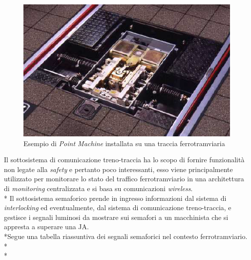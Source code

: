 \begin{itemize}
\begin{figure}[h]
		\centering
		\includegraphics[width=0.7\linewidth]{img/pointmachine}
		\caption{Esempio di \emph{Point Machine} installata su una traccia ferrotramviaria}
		\label{fig:pointmachine}
	\end{figure}
\end{itemize}
Il sottosistema di comunicazione treno-traccia ha lo scopo di fornire funzionalit\`a non legate alla \emph{safety} e pertanto poco interessanti, esso viene principalmente utilizzato per monitorare lo stato del traffico ferrotramviario in una architettura di \emph{monitoring} centralizzata e si basa su comunicazioni \emph{wireless}.\\*
Il sottosistema semaforico prende in ingresso informazioni dal sistema di \emph{interlocking} ed eventualmente, dal sistema di comunicazione treno-traccia, e gestisce i segnali luminosi da mostrare sui semafori a un macchinista che si appresta a superare una JA.\\*Segue una tabella riassuntiva dei segnali semaforici nel contesto ferrotramviario.\\*\\*
